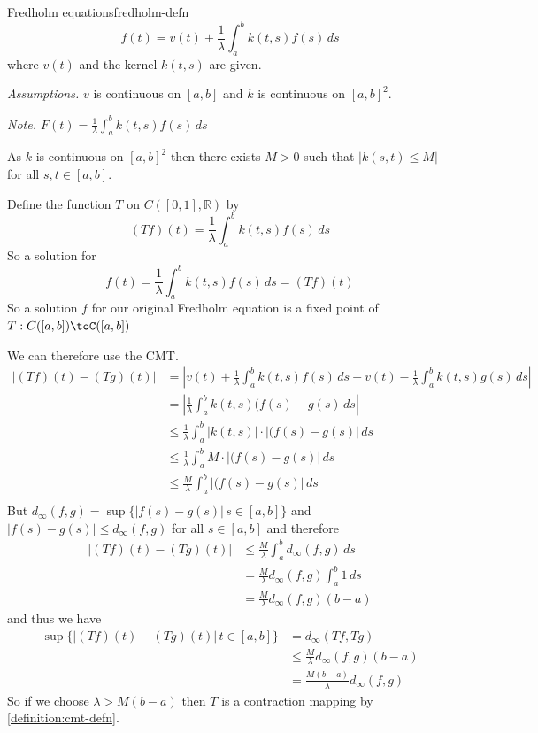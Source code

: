 \documentclass{article}
\numberwithin{equation}{section}
\numberwithin{figure}{section}
\begin{document}
\begin{example}{Fredholm equations}{fredholm-defn}
    \begin{equation}
        f(t) = v(t) + \frac{1}{\lambda}\int^b_a k(t,s)f(s) \,ds
    \end{equation}
    where $v(t)$ and the kernel $k(t,s)$ are given.

    \emph{Assumptions.} $v$ is continuous on $[a,b]$ and $k$ is continuous on $[a,b]^2$.

    \emph{Note. $F(t) = \frac{1}{\lambda}\int^b_a k(t,s)f(s) \,ds$}

    As $k$ is continuous on $[a,b]^2$ then there exists $M>0$ such that $|k(s,t)\leq M|$ for all $s,t \in [a,b]$.

    Define the function $T$ on $C([0,1],\mathbb{R})$ by 
    \begin{equation}
        (Tf)(t) = \frac{1}{\lambda}\int^b_a k(t,s)f(s) \,ds
    \end{equation}
    So a solution for 
    \begin{equation}
        f(t) = \frac{1}{\lambda}\int^b_a k(t,s)f(s) \,ds = (Tf)(t)
    \end{equation}
    So a solution $f$ for our original Fredholm equation is a fixed point of $T: C([a,b])\toC([a,b])$

    We can therefore use the CMT.
    \begin{align}
        |(Tf)(t)-(Tg)(t)| &= \left\vert v(t) + \frac{1}{\lambda}\int^b_a k(t,s)f(s) \,ds-v(t)- \frac{1}{\lambda}\int^b_a k(t,s)g(s) \,ds\right\vert \\
        &= \left\vert \frac{1}{\lambda}\int^b_a k(t,s)(f(s)-g(s) \,ds\right\vert\\
        &\leq \frac{1}{\lambda}\int^b_a |k(t,s)|\cdot|(f(s)-g(s)| \,ds\\
        &\leq \frac{1}{\lambda}\int^b_a M\cdot|(f(s)-g(s)| \,ds \\
        &\leq \frac{M}{\lambda}\int^b_a |(f(s)-g(s)| \,ds \\
    \end{align}
    But $d_\infty(f,g)=\sup\{|f(s)-g(s)|\, s \in [a,b]\}$ and $|f(s)-g(s)| \leq d_\infty(f,g)$ for all $s \in [a,b]$ and therefore
    \begin{align}
        |(Tf)(t)-(Tg)(t)| &\leq \frac{M}{\lambda}\int^b_a d_\infty(f,g) \,ds \\
        &= \frac{M}{\lambda}d_\infty(f,g)\int^b_a 1 \,ds\\
        &= \frac{M}{\lambda}d_\infty(f,g)(b-a)
    \end{align}
    and thus we have 
    \begin{align}
        \sup\{|(Tf)(t)-(Tg)(t)| \, t \in [a,b]\} &= d_\infty(Tf, Tg)\\
        &\leq \frac{M}{\lambda}d_\infty(f,g)(b-a)\\
        &= \frac{M(b-a)}{\lambda}d_\infty(f,g)
    \end{align}
    So if we choose $\lambda>M(b-a)$ then $T$ is a contraction mapping by \cref{definition:cmt-defn}.
\end{example}
\pagebreak
\end{document}
